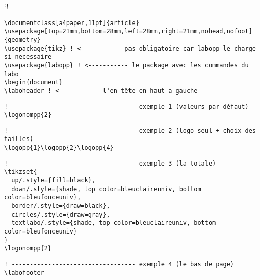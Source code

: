 \documentclass[a4paper,11pt]{article}
\begin{document}
\laboheader

\def\CommentChar{\char37}
\catcode`!=\active
\begin{Verbatim}[defineactive=\def!{\color{orange}\CommentChar}]
\documentclass[a4paper,11pt]{article}
\usepackage[top=21mm,bottom=28mm,left=28mm,right=21mm,nohead,nofoot]{geometry}
\usepackage{tikz} ! <----------- pas obligatoire car labopp le charge si necessaire
\usepackage{labopp} ! <----------- le package avec les commandes du labo
\begin{document}
\laboheader ! <----------- l'en-tête en haut a gauche
\end{Verbatim}


\begin{Verbatim}[defineactive=\def!{\color{orange}\CommentChar}]
! ---------------------------------- exemple 1 (valeurs par défaut)
\logonompp{2}
\end{Verbatim}

\begin{Verbatim}[defineactive=\def!{\color{orange}\CommentChar}]
! ---------------------------------- exemple 2 (logo seul + choix des tailles)
\logopp{1}\logopp{2}\logopp{4}
\end{Verbatim}


\begin{Verbatim}[defineactive=\def!{\color{orange}\CommentChar}]
! ---------------------------------- exemple 3 (la totale)
\tikzset{
  up/.style={fill=black},
  down/.style={shade, top color=bleuclaireuniv, bottom color=bleufonceuniv},
  border/.style={draw=black},
  circles/.style={draw=gray},
  textlabo/.style={shade, top color=bleuclaireuniv, bottom color=bleufonceuniv}
}
\logonompp{2}
\end{Verbatim}
{ %
}



\vfill

\begin{Verbatim}[defineactive=\def!{\color{orange}\CommentChar}]
! ---------------------------------- exemple 4 (le bas de page)
\labofooter
\end{Verbatim}
\labofooter
\end{document}
